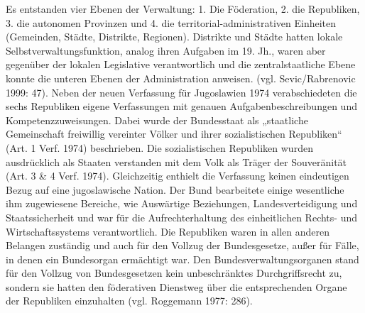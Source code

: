 Es entstanden vier Ebenen der Verwaltung: 1. Die Föderation, 2. die Republiken, 3. die autonomen Provinzen und 4. die territorial-administrativen Einheiten (Gemeinden, Städte, Distrikte, Regionen). Distrikte und Städte hatten lokale Selbstverwaltungsfunktion, analog ihren Aufgaben im 19. Jh., waren aber gegenüber der lokalen Legislative verantwortlich und die zentralstaatliche Ebene konnte die unteren Ebenen der Administration anweisen. (vgl. Sevic/Rabrenovic 1999: 47). Neben der neuen Verfassung für Jugoslawien 1974 verabschiedeten die sechs Republiken eigene Verfassungen mit genauen Aufgabenbeschreibungen und Kompetenzzuweisungen. Dabei wurde der Bundesstaat als „staatliche Gemeinschaft freiwillig vereinter Völker und ihrer sozialistischen Republiken“ (Art. 1 Verf. 1974) beschrieben. Die sozialistischen Republiken wurden ausdrücklich als Staaten verstanden mit dem Volk als Träger der Souveränität (Art. 3 \& 4 Verf. 1974). Gleichzeitig enthielt die Verfassung keinen eindeutigen Bezug auf eine jugoslawische Nation. Der Bund bearbeitete einige wesentliche ihm zugewiesene Bereiche, wie Auswärtige Beziehungen, Landesverteidigung und Staatssicherheit und war für die Aufrechterhaltung des einheitlichen Rechts- und Wirtschaftssystems verantwortlich. Die Republiken waren in allen anderen Belangen zuständig und auch für den Vollzug der Bundesgesetze, außer für Fälle, in denen ein Bundesorgan ermächtigt war. Den Bundesverwaltungsorganen stand für den Vollzug von Bundesgesetzen kein unbeschränktes Durchgriffsrecht zu, sondern sie hatten den föderativen Dienstweg über die entsprechenden Organe der Republiken einzuhalten (vgl. Roggemann 1977: 286).\par
